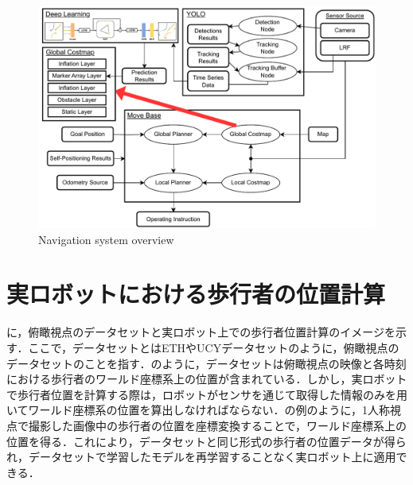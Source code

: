 \begin{figure}[H]
  \centering
 \includegraphics[keepaspectratio, scale=0.77]
      {images/application_system.pdf}
 \caption{Navigation system overview}
 \label{Fig:nav-system}
\end{figure}

\vspace{-30pt}

\section{実ロボットにおける歩行者の位置計算}\label{sec:real-robot}
に，俯瞰視点のデータセットと実ロボット上での歩行者位置計算のイメージを示す．ここで，データセットとはETH\cite{pellegrini2009you-eth}やUCY\cite{lerner2007crowds-ucy}データセットのように，俯瞰視点のデータセットのことを指す．のように，データセットは俯瞰視点の映像と各時刻における歩行者のワールド座標系上の位置が含まれている．しかし，実ロボットで歩行者位置を計算する際は，ロボットがセンサを通じて取得した情報のみを用いてワールド座標系の位置を算出しなければならない．の例のように，1人称視点で撮影した画像中の歩行者の位置を座標変換することで，ワールド座標系上の位置を得る．これにより，データセットと同じ形式の歩行者の位置データが得られ，データセットで学習したモデルを再学習することなく実ロボット上に適用できる．

